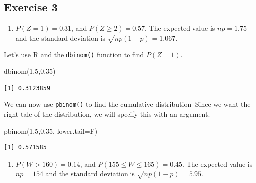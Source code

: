\documentclass[
  letterpaper,
  DIV=11,
  numbers=noendperiod]{scrreprt}
\newenvironment{Shaded}{\begin{snugshade}}{\end{snugshade}}
\newcommand{\AttributeTok}[1]{\textcolor[rgb]{0.40,0.45,0.13}{#1}}
\newcommand{\DecValTok}[1]{\textcolor[rgb]{0.68,0.00,0.00}{#1}}
\newcommand{\FloatTok}[1]{\textcolor[rgb]{0.68,0.00,0.00}{#1}}
\newcommand{\FunctionTok}[1]{\textcolor[rgb]{0.28,0.35,0.67}{#1}}
\newcommand{\NormalTok}[1]{\textcolor[rgb]{0.00,0.23,0.31}{#1}}
\providecommand{\tightlist}{%
  \setlength{\itemsep}{0pt}\setlength{\parskip}{0pt}}\usepackage{longtable,booktabs,array}
\begin{document}
\hypertarget{exercise-3-17}{%
\subsection*{Exercise 3}\label{exercise-3-17}}

\begin{enumerate}
\def\labelenumi{\arabic{enumi}.}
\tightlist
\item
  \(P(Z=1)=0.31\), and \(P(Z \geq 2)=0.57\). The expected value is
  \(np=1.75\) and the standard deviation is \(\sqrt{np(1-p)}=1.067\).
\end{enumerate}

Let's use R and the \texttt{dbinom()} function to find \(P(Z=1)\).

\begin{Shaded}
\begin{Highlighting}[numbers=left,,]
\FunctionTok{dbinom}\NormalTok{(}\DecValTok{1}\NormalTok{,}\DecValTok{5}\NormalTok{,}\FloatTok{0.35}\NormalTok{)}
\end{Highlighting}
\end{Shaded}

\begin{verbatim}
[1] 0.3123859
\end{verbatim}

We can now use \texttt{pbinom()} to find the cumulative distribution.
Since we want the right tale of the distribution, we will specify this
with an argument.

\begin{Shaded}
\begin{Highlighting}[numbers=left,,]
\FunctionTok{pbinom}\NormalTok{(}\DecValTok{1}\NormalTok{,}\DecValTok{5}\NormalTok{,}\FloatTok{0.35}\NormalTok{, }\AttributeTok{lower.tail=}\NormalTok{F)}
\end{Highlighting}
\end{Shaded}

\begin{verbatim}
[1] 0.571585
\end{verbatim}

\begin{enumerate}
\def\labelenumi{\arabic{enumi}.}
\setcounter{enumi}{1}
\tightlist
\item
  \(P(W>160)=0.14\), and \(P(155 \leq W \leq 165 )=0.45\). The expected
  value is \(np=154\) and the standard deviation is
  \(\sqrt{np(1-p)}=5.95\).
\end{enumerate}
\end{document}
